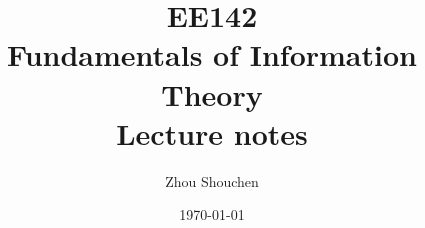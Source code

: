 \documentclass[12pt, a4paper, oneside]{ctexbook}
\title{{\Huge{\textbf{EE142 \\ Fundamentals of Information Theory}}}\\Lecture notes}
\author{Zhou Shouchen}
\date{\today}
\begin{document}
\maketitle

\iffalse
\pagenumbering{roman}
\setcounter{page}{1}

\begin{center}
    \Huge\textbf{前言}
\end{center}~\

这是笔记的前言部分.
~\\
\begin{flushright}
    \begin{tabular}{c}
        Zhou Shouchen\\
        \today
    \end{tabular}
\end{flushright}
\newpage
\fi


\setcounter{page}{1}
\tableofcontents
\newpage
\setcounter{page}{1}



\end{document}
